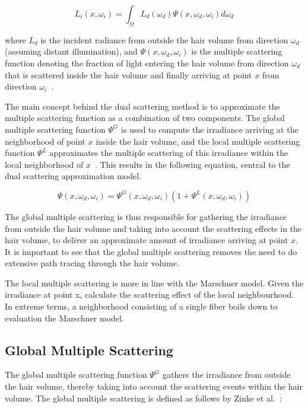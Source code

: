 \begin{equation}
L_i(x, \omega_i) = \int_{\Omega} L_d(\omega_d) \Psi(x, \omega_d, \omega_i) d\omega_d
\end{equation}

where $L_d$ is the incident radiance from outside the hair volume from direction $\omega_d$ (assuming distant illumination), and $\Psi(x, \omega_d, \omega_i)$ is the multiple scattering function denoting the fraction of light entering the hair volume from direction $\omega_d$ that is scattered inside the hair volume and finally arriving at point $x$ from direction $\omega_i$~\cite{zinke}.


%
%

The main concept behind the dual scattering method is to approximate the multiple scattering function as a combination of two components. The global multiple scattering function $\Psi^G$ is used to compute the irradiance arriving at the neighborhood of point $x$ inside the hair volume, and the local multiple scattering function $\Psi^L$ approximates the multiple scattering of this irradiance within the local neighborhood of $x$~\cite{zinke}.
This results in the following equation, central to the dual scattering approximation model.

\begin{equation}
\Psi(x, \omega_d, \omega_i) = \Psi^G(x, \omega_d, \omega_i) (1 + \Psi^L(x, \omega_d, \omega_i))
\end{equation}

The global multiple scattering is thus responsible for gathering the irradiance from outside the hair volume and taking into account the scattering effects in the hair volume, to deliver an approximate amount of irradiance arriving at point $x$. It is important to see that the global multiple scattering removes the need to do extensive path tracing through the hair volume.

The local multiple scattering is more in line with the Marschner model. Given the irradiance at point x, calculate the scattering effect of the local neighbourhood. In extreme terms, a neighborhood consisting of a single fiber boils down to evaluation the Marschner model.

\subsection{Global Multiple Scattering}

The global multiple scattering function $\Psi^G$ gathers the irradiance from outside the hair volume, thereby taking into account the scattering events within the hair volume. The global multiple scattering is defined as follows by Zinke et al.~\cite{zinke}:


